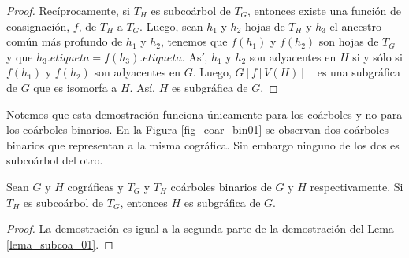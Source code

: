 \begin{proof}
    Rec\'iprocamente, si $T_H$ es subcoárbol de $T_G$, entonces existe
    una función de coasignación, $f$, de $T_H$ a $T_G$. Luego, sean $h_1$ y
    $h_2$ hojas de $T_H$ y $h_3$ el ancestro común más profundo de $h_1$ y
    $h_2$, tenemos que $f(h_1)$ y $f(h_2)$ son hojas de $T_G$ y que
    $h_3.etiqueta = f(h_3).etiqueta$. Así, $h_1$ y $h_2$ son adyacentes
    en $H$ si y sólo si $f(h_1)$ y $f(h_2)$ son adyacentes en $G$. Luego,
    $G[f[V(H)]]$ es una subgráfica de $G$ que es isomorfa a $H$. Así, $H$
    es subgráfica de $G$.

\end{proof}

Notemos que esta demostración funciona únicamente para los coárboles y no para los coárboles binarios. En la Figura \ref{fig_coar_bin01} se observan dos coárboles binarios que representan a la misma cográfica. Sin embargo ninguno de los dos es subcoárbol del otro.

\begin{lemma}
    Sean $G$ y $H$ cográficas y $T_G$ y $T_H$ coárboles binarios de $G$ y $H$ respectivamente. Si $T_H$ es subcoárbol de $T_G$, entonces $H$ es subgráfica de $G$.
\end{lemma}

\begin{proof}
    La demostración es igual a la segunda parte de la demostración del Lema \ref{lema_subcoa_01}.
\end{proof}